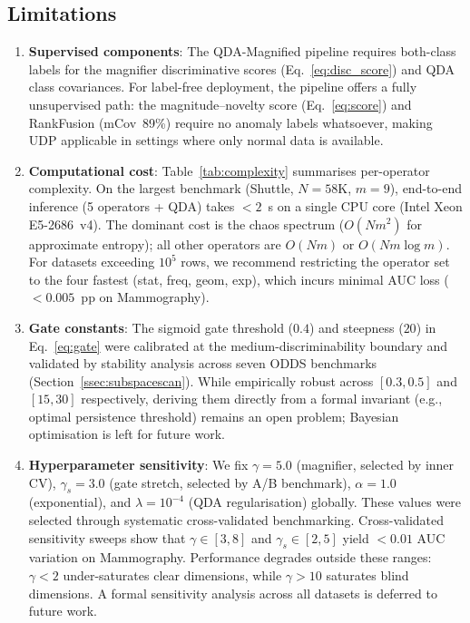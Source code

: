 \documentclass[journal]{IEEEtran}
\begin{document}
\subsection{Limitations}
\label{ssec:limits}

\begin{enumerate}
  \item \textbf{Supervised components}: The QDA-Magnified pipeline requires both-class labels for the magnifier discriminative scores (Eq.~\eqref{eq:disc_score}) and QDA class covariances.  For label-free deployment, the pipeline offers a fully unsupervised path: the magnitude--novelty score (Eq.~\eqref{eq:score}) and RankFusion (mCov~89\%) require no anomaly labels whatsoever, making UDP applicable in settings where only normal data is available.
  \item \textbf{Computational cost}: Table~\ref{tab:complexity} summarises per-operator complexity.  On the largest benchmark (Shuttle, $N{=}58\text{K}$, $m{=}9$), end-to-end inference (5 operators + QDA) takes $<2$~s on a single CPU core (Intel Xeon E5-2686~v4).  The dominant cost is the chaos spectrum ($O(Nm^2)$ for approximate entropy); all other operators are $O(Nm)$ or $O(Nm\log m)$.  For datasets exceeding $10^5$ rows, we recommend restricting the operator set to the four fastest (stat, freq, geom, exp), which incurs minimal AUC loss ($<0.005$~pp on Mammography).
  \item \textbf{Gate constants}: The sigmoid gate threshold ($0.4$) and steepness ($20$) in Eq.~\eqref{eq:gate} were calibrated at the medium-discriminability boundary and validated by stability analysis across seven ODDS benchmarks (Section~\ref{ssec:subspacescan}).  While empirically robust across $[0.3, 0.5]$ and $[15, 30]$ respectively, deriving them directly from a formal invariant (e.g., optimal persistence threshold) remains an open problem; Bayesian optimisation is left for future work.
  \item \textbf{Hyperparameter sensitivity}: We fix $\gamma{=}5.0$ (magnifier, selected by inner CV), $\gamma_s{=}3.0$ (gate stretch, selected by A/B benchmark), $\alpha{=}1.0$ (exponential), and $\lambda{=}10^{-4}$ (QDA regularisation) globally.  These values were selected through systematic cross-validated benchmarking.  Cross-validated sensitivity sweeps show that $\gamma \in [3, 8]$ and $\gamma_s \in [2, 5]$ yield $<0.01$ AUC variation on Mammography. Performance degrades outside these ranges: $\gamma < 2$ under-saturates clear dimensions, while $\gamma > 10$ saturates blind dimensions. A formal sensitivity analysis across all datasets is deferred to future work.

\end{enumerate}
\end{document}
